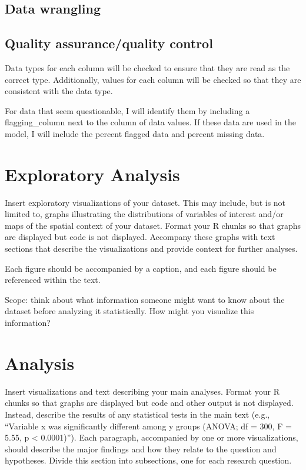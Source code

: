 \documentclass[12pt,]{article}
\begin{document}
\hypertarget{data-wrangling}{%
\subsection{Data wrangling}\label{data-wrangling}}

\hypertarget{quality-assurancequality-control}{%
\subsection{Quality assurance/quality
control}\label{quality-assurancequality-control}}

Data types for each column will be checked to ensure that they are read
as the correct type. Additionally, values for each column will be
checked so that they are consistent with the data type.

For data that seem questionable, I will identify them by including a
flagging\_column next to the column of data values. If these data are
used in the model, I will include the percent flagged data and percent
missing data.

\newpage

\hypertarget{exploratory-analysis}{%
\section{Exploratory Analysis}\label{exploratory-analysis}}

Insert exploratory visualizations of your dataset. This may include, but
is not limited to, graphs illustrating the distributions of variables of
interest and/or maps of the spatial context of your dataset. Format your
R chunks so that graphs are displayed but code is not displayed.
Accompany these graphs with text sections that describe the
visualizations and provide context for further analyses.

Each figure should be accompanied by a caption, and each figure should
be referenced within the text.

Scope: think about what information someone might want to know about the
dataset before analyzing it statistically. How might you visualize this
information?

\newpage

\hypertarget{analysis}{%
\section{Analysis}\label{analysis}}

Insert visualizations and text describing your main analyses. Format
your R chunks so that graphs are displayed but code and other output is
not displayed. Instead, describe the results of any statistical tests in
the main text (e.g., ``Variable x was significantly different among y
groups (ANOVA; df = 300, F = 5.55, p \textless{} 0.0001)''). Each
paragraph, accompanied by one or more visualizations, should describe
the major findings and how they relate to the question and hypotheses.
Divide this section into subsections, one for each research question.
\end{document}
